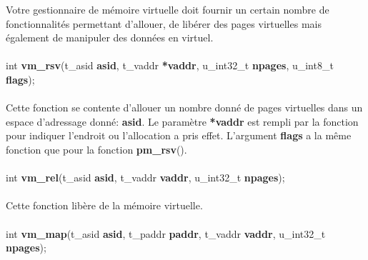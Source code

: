 \documentclass[10pt,a4wide]{article}
\begin{document}
Votre gestionnaire de m\'emoire virtuelle doit fournir un certain nombre
de fonctionnalit\'es permettant d'allouer, de lib\'erer des pages
virtuelles mais \'egalement de manipuler des donn\'ees en virtuel.

\paragraph{}

\hspace{1.5cm}int \textbf{vm\_rsv}(t\_asid \textbf{asid},
                                   t\_vaddr \textbf{*vaddr},
                                   u\_int32\_t \textbf{npages},
                                   u\_int8\_t \textbf{flags});

\paragraph{}

Cette fonction se contente d'allouer un nombre donn\'e de pages virtuelles
dans un espace d'adressage donn\'e: \textbf{asid}. Le param\`etre
\textbf{*vaddr} est rempli par la fonction pour indiquer l'endroit ou
l'allocation a pris effet. L'argument \textbf{flags} a la m\^eme fonction
que pour la fonction \textbf{pm\_rsv}().

\paragraph{}

\hspace{1.5cm}int \textbf{vm\_rel}(t\_asid \textbf{asid},
                                   t\_vaddr \textbf{vaddr},
                                   u\_int32\_t \textbf{npages});

\paragraph{}

Cette fonction lib\`ere de la m\'emoire virtuelle.

\paragraph{}

\hspace{1.5cm}int \textbf{vm\_map}(t\_asid \textbf{asid},
				   t\_paddr \textbf{paddr},
                                   t\_vaddr \textbf{vaddr},
                                   u\_int32\_t \textbf{npages});
\end{document}
